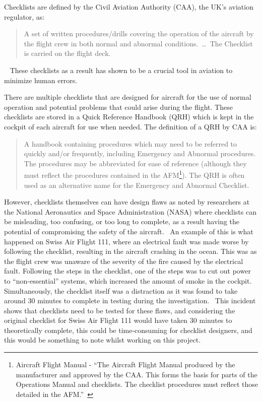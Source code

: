 \documentclass[../dissertation.tex]{subfiles}
\begin{document}

Checklists are defined by the Civil Aviation Authority (CAA),
the UK's aviation regulator, as:
%
\blockquote{A set of written procedures/drills covering
  the operation of the aircraft by the flight
  crew in both normal and abnormal
  conditions.~\ldots~The Checklist is
  carried on the flight deck.}~\cite{caa:design}
These checklists as a result has shown to be a crucial tool in aviation
to minimize human errors.~\cite{manifesto}

There are multiple checklists that are designed for aircraft for the use of
normal operation and potential problems that could arise during the flight.
These checklists are stored in a Quick Reference Handbook (QRH) which is
kept in the cockpit of each aircraft for use when needed. The definition
of a QRH by CAA is:
%
\blockquote{A handbook containing procedures which
  may need to be referred to quickly and/or
  frequently, including Emergency and
  Abnormal procedures. The procedures
  may be abbreviated for ease of reference
  (although they must reflect the procedures
  contained in the AFM\footnote{
    Aircraft Flight Manual - \enquote{The Aircraft Flight Manual produced by the
    manufacturer and approved by the CAA.
    This forms the basis for parts of the
    Operations Manual and checklists. The
    checklist procedures must reflect those
    detailed in the AFM.}~\cite{caa:design}
  }).
  The QRH is often
  used as an alternative name for the
  Emergency and Abnormal Checklist.~\cite{caa:design}}

However, checklists themselves can have design flaws as noted by researchers at
the National Aeronautics and Space Administration (NASA) where checklists
can be misleading, too confusing, or too long to complete, as a result
having the potential of compromising the safety of the aircraft.~\cite{nasa:design}
An example of this is what happened on Swiss Air Flight 111, where an electrical fault
was made worse by following the checklist, resulting in the aircraft crashing in the ocean.
This was as the flight crew was unaware of the severity of the fire caused by the
electrical fault. Following the steps in the checklist, one of the steps was
to cut out power to \enquote{non-essential} systems, which increased the
amount of smoke in the cockpit.
Simultaneously, the checklist itself was a distraction as it was found to take
around 30 minutes to complete in testing during the investigation.~\cite{tsb:SWR111}
This incident shows that checklists need to be tested for these flaws, and considering
the original checklist for Swiss Air Flight 111 would have taken 30 minutes
to theoretically complete, this could be time-consuming for checklist designers,
and this would be something to note whilst working on this project.
\end{document}
